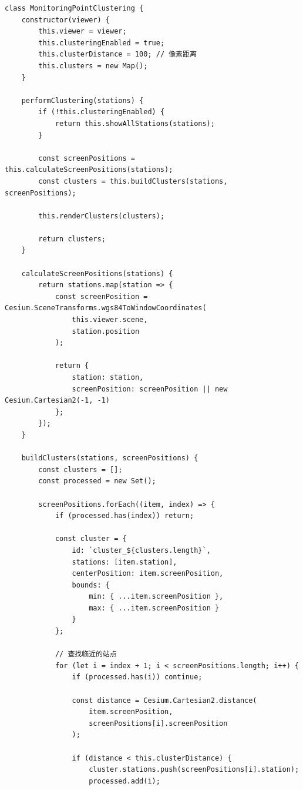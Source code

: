 \begin{lstlisting}
class MonitoringPointClustering {
    constructor(viewer) {
        this.viewer = viewer;
        this.clusteringEnabled = true;
        this.clusterDistance = 100; // 像素距离
        this.clusters = new Map();
    }
    
    performClustering(stations) {
        if (!this.clusteringEnabled) {
            return this.showAllStations(stations);
        }
        
        const screenPositions = this.calculateScreenPositions(stations);
        const clusters = this.buildClusters(stations, screenPositions);
        
        this.renderClusters(clusters);
        
        return clusters;
    }
    
    calculateScreenPositions(stations) {
        return stations.map(station => {
            const screenPosition = Cesium.SceneTransforms.wgs84ToWindowCoordinates(
                this.viewer.scene,
                station.position
            );
            
            return {
                station: station,
                screenPosition: screenPosition || new Cesium.Cartesian2(-1, -1)
            };
        });
    }
    
    buildClusters(stations, screenPositions) {
        const clusters = [];
        const processed = new Set();
        
        screenPositions.forEach((item, index) => {
            if (processed.has(index)) return;
            
            const cluster = {
                id: `cluster_${clusters.length}`,
                stations: [item.station],
                centerPosition: item.screenPosition,
                bounds: {
                    min: { ...item.screenPosition },
                    max: { ...item.screenPosition }
                }
            };
            
            // 查找临近的站点
            for (let i = index + 1; i < screenPositions.length; i++) {
                if (processed.has(i)) continue;
                
                const distance = Cesium.Cartesian2.distance(
                    item.screenPosition,
                    screenPositions[i].screenPosition
                );
                
                if (distance < this.clusterDistance) {
                    cluster.stations.push(screenPositions[i].station);
                    processed.add(i);
                    

\end{lstlisting}
